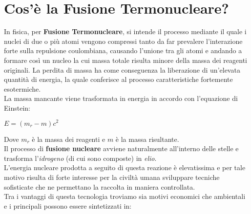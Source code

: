 \newpage

\section*{Cos'è la Fusione Termonucleare?}
In fisica, per \textbf{Fusione Termonucleare}, si intende il processo mediante il quale i nuclei di due o più atomi vengono compressi tanto da far prevalere l’interazione forte sulla repulsione coulombiana, causando l'unione tra gli atomi e andando a formare così un nucleo la cui massa totale risulta minore della massa dei reagenti originali. La perdita di massa ha come conseguenza la liberazione di un’elevata quantità di energia, la quale conferisce al processo caratteristiche fortemente esotermiche.\\
La massa mancante viene trasformata in energia in accordo con l’equazione di Einstein:
\begin{center}
	$E = (m_r - m)c^2$
\end{center}
Dove $ m_r $ è la massa dei reagenti e $ m $ è la massa risultante.\\
Il processo di \textbf{fusione nucleare} avviene naturalmente all'interno delle stelle e trasforma l'\textit{idrogeno} (di cui sono composte) in \textit{elio}.\\
L'energia nucleare prodotta a seguito di questa reazione è elevatissima e per tale motivo risulta di forte interesse per la civiltà umana sviluppare tecniche sofisticate che ne permettano la raccolta in maniera controllata.\\
Tra i vantaggi di questa tecnologia troviamo sia motivi economici che ambientali e i principali possono essere sintetizzati in:
